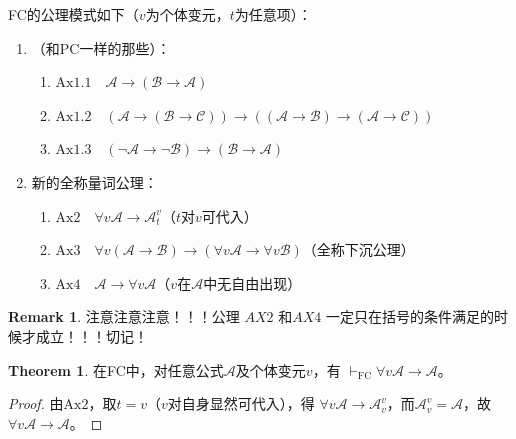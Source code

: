 \documentclass[oneside]{book}
\theoremstyle{definition}
\newtheorem{theorem}{Theorem}[section]
\newtheorem{remark}{Remark}[section]
\begin{document}
FC的公理模式如下（\( v \)为个体变元，\( t \)为任意项）：
\begin{enumerate}
	\item （和PC一样的那些）：
	\begin{enumerate}
		\item \( \text{Ax1.1}\quad \mathcal{A} \to (\mathcal{B} \to \mathcal{A}) \)
		\item \( \text{Ax1.2}\quad (\mathcal{A} \to (\mathcal{B} \to \mathcal{C})) \to ((\mathcal{A} \to \mathcal{B}) \to (\mathcal{A} \to \mathcal{C})) \)
		\item \( \text{Ax1.3}\quad (\neg \mathcal{A} \to \neg \mathcal{B}) \to (\mathcal{B} \to \mathcal{A}) \)
	\end{enumerate}
	\item 新的全称量词公理：
	\begin{enumerate}
		\item \( \text{Ax2}\quad \forall v \mathcal{A} \to \mathcal{A}_t^v \)（\( t \)对\( v \)可代入）
		\item \( \text{Ax3}\quad \forall v (\mathcal{A} \to \mathcal{B}) \to (\forall v \mathcal{A} \to \forall v \mathcal{B}) \)（全称下沉公理）
		\item \( \text{Ax4}\quad \mathcal{A} \to \forall v \mathcal{A} \)（\( v \)在\( \mathcal{A} \)中无自由出现）
	\end{enumerate}
\end{enumerate}
\begin{remark}
	注意注意注意！！！公理 \(AX2\) 和\(AX4\) 一定只在括号的条件满足的时候才成立！！！切记！
 \end{remark}

\begin{theorem}
	在FC中，对任意公式\( \mathcal{A} \)及个体变元\( v \)，有 \( \vdash_{\text{FC}} \forall v \mathcal{A} \to \mathcal{A} \)。
\end{theorem}
\begin{proof}
	由\( \text{Ax2} \)，取\( t = v \)（\( v \)对自身显然可代入），得 \( \forall v \mathcal{A} \to \mathcal{A}_v^v \)，而\( \mathcal{A}_v^v = \mathcal{A} \)，故 \( \forall v \mathcal{A} \to \mathcal{A} \)。
\end{proof}
\end{document}
